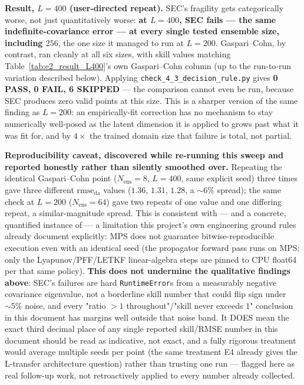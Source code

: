 \documentclass[11pt]{article}
\begin{document}
\textbf{Result, $L=400$ (user-directed repeat).} SEC's fragility gets
categorically worse, not just quantitatively worse: \textbf{at
$L=400$, SEC fails --- the same indefinite-covariance error --- at
every single tested ensemble size, including $256$}, the one size it
managed to run at $L=200$. Gaspari--Cohn, by contrast, ran cleanly at
all six sizes, with skill values matching Table~\ref{tab:e2_result_L400}'s
own Gaspari--Cohn column (up to the run-to-run variation described
below). Applying \texttt{check\_4\_3\_decision\_rule.py} gives
\textbf{0 PASS, 0 FAIL, 6 SKIPPED} --- the comparison cannot even be
run, because SEC produces zero valid points at this size. This is a
sharper version of the same finding as $L=200$: an empirically-fit
correction has no mechanism to stay numerically well-posed as the
latent dimension it is applied to grows past what it was fit for, and
by $4\times$ the trained domain size that failure is total, not
partial.

\textbf{Reproducibility caveat, discovered while re-running this
sweep and reported honestly rather than silently smoothed over.}
Repeating the identical Gaspari--Cohn point ($N_{\mathrm{ens}}=8$,
$L=400$, same explicit seed) three times gave three different
$\mathrm{rmse}_{\mathrm{da}}$ values ($1.36$, $1.31$, $1.28$, a
$\sim6\%$ spread); the same check at $L=200$
($N_{\mathrm{ens}}=64$) gave two repeats of one value and one
differing repeat, a similar-magnitude spread. This is consistent with
--- and a concrete, quantified instance of --- a limitation this
project's own engineering ground rules already document explicitly:
MPS does not guarantee bitwise-reproducible execution even with an
identical seed (the propagator forward pass runs on MPS; only the
Lyapunov/PFF/LETKF linear-algebra steps are pinned to CPU float64 per
that same policy). \textbf{This does not undermine the qualitative
findings above}: SEC's failures are hard \texttt{RuntimeError}s from a
measurably negative covariance eigenvalue, not a borderline skill
number that could flip sign under $\sim5\%$ noise, and every
"ratio $>1$ throughout"/"skill never exceeds $1$" conclusion in this
document has margins well outside that noise band. It DOES mean the
exact third decimal place of any single reported skill/RMSE number in
this document should be read as indicative, not exact, and a fully
rigorous treatment would average multiple seeds per point (the same
treatment E4 already gives the L-transfer architecture question) rather
than trusting one run --- flagged here as real follow-up work, not
retroactively applied to every number already collected.
\end{document}
